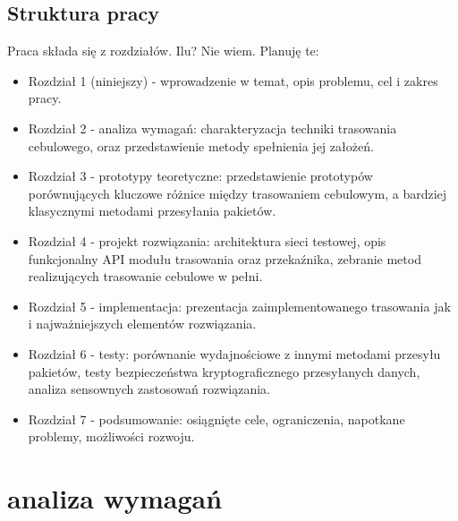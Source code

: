 \documentclass[thesis=inz,faculty=ee]{EE-dyplom}
\begin{document}
    \section{Struktura pracy}
    \label{sec:struktura}
    
    Praca składa się z rozdziałów. Ilu? Nie wiem. Planuję te:

     \begin{itemize}
         \item Rozdział 1 (niniejszy) - wprowadzenie w temat, opis problemu, cel i zakres pracy.
         
         \item Rozdział 2 - analiza wymagań: charakteryzacja techniki trasowania cebulowego, oraz przedstawienie metody spełnienia jej założeń.
         
         \item Rozdział 3 - prototypy teoretyczne: przedstawienie prototypów porównujących kluczowe różnice między trasowaniem cebulowym, a bardziej klasycznymi metodami
         przesyłania pakietów.
         
         \item Rozdział 4 - projekt rozwiązania: architektura sieci testowej, opis funkcjonalny API modułu trasowania oraz przekaźnika, zebranie metod realizujących trasowanie cebulowe
         w pełni.
         
         \item Rozdział 5 - implementacja: prezentacja zaimplementowanego trasowania jak i najważniejszych elementów rozwiązania.
         
         \item Rozdział 6 - testy: porównanie wydajnościowe z innymi metodami przesyłu pakietów, testy bezpieczeństwa kryptograficznego przesyłanych danych, analiza sensownych zastosowań
         rozwiązania.
         
         \item Rozdział 7 - podsumowanie: osiągnięte cele, ograniczenia, napotkane problemy, możliwości rozwoju.
     \end{itemize}

    
    \chapter{analiza wymagań}
    
\end{document}
